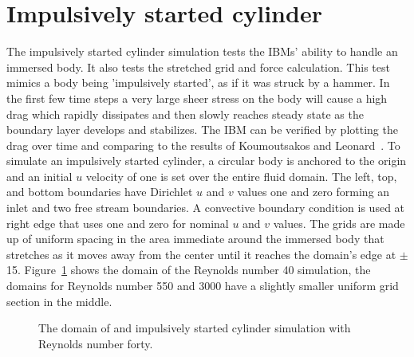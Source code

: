 \section{Impulsively started cylinder}
\label{sec:cylinder}
The impulsively started cylinder simulation tests the IBMs' ability to handle an immersed body. 
It also tests the stretched grid and force calculation. 
This test mimics a body being 'impulsively started', as if it was struck by a hammer. 
In the first few time steps a very large sheer stress on the body will cause a high drag which rapidly dissipates and then slowly reaches steady state as the boundary layer develops and stabilizes. 
The IBM can be verified by plotting the drag over time and comparing to the results of Koumoutsakos and Leonard~\cite{Koumoutsakos:1995bf}. 
To simulate an impulsively started cylinder, a circular body is anchored to the origin and an initial $u$ velocity of one is set over the entire fluid domain. 
The left, top, and bottom boundaries have Dirichlet $u$ and $v$ values one and zero forming an inlet and two free stream boundaries. 
A convective boundary condition is used at right edge that uses one and zero for nominal $u$ and $v$ values. 
The grids are made up of uniform spacing in the area immediate around the immersed body that stretches as it moves away from the center until it reaches the domain's edge at $\pm$ 15. 
Figure~\ref{fig:iscylinder} shows the domain of the Reynolds number 40 simulation, the domains for Reynolds number 550 and 3000 have a slightly smaller uniform grid section in the middle. 
\begin{figure}[!htb]
	\centering
	
	\caption{The domain of and impulsively started cylinder simulation with Reynolds number forty.}
	\label{fig:iscylinder}
\end{figure}

